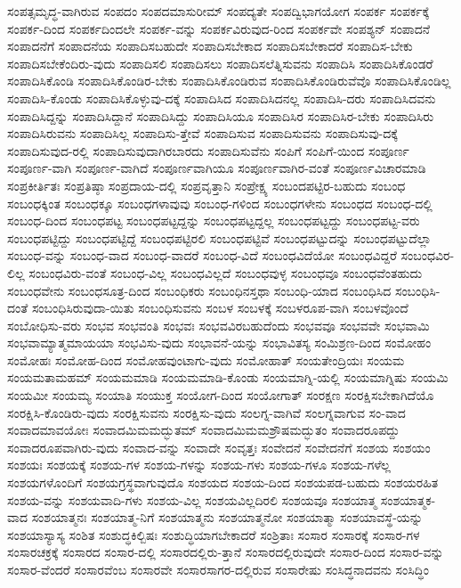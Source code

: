 {ಸಂಪತ್ಸಮೃದ್ಧ-ವಾಗಿರುವ
ಸಂಪದಂ
ಸಂಪದಮಾಸುರೀಮ್
ಸಂಪದ್ಯತೇ
ಸಂಪದ್ವಿಭಾಗಯೋಗ
ಸಂಪರ್ಕ
ಸಂಪರ್ಕಕ್ಕೆ
ಸಂಪರ್ಕ-ದಿಂದ
ಸಂಪರ್ಕದಿಂದಲೇ
ಸಂಪರ್ಕ-ವನ್ನು
ಸಂಪರ್ಕವಿರುವುದ-ರಿಂದ
ಸಂಪರ್ಕವೇ
ಸಂಪಶ್ಯನ್
ಸಂಪಾದನೆ
ಸಂಪಾದನೆಗೆ
ಸಂಪಾದನೆಯ
ಸಂಪಾದಿಸಬಹುದೇ
ಸಂಪಾದಿಸಬೇಕಾದ
ಸಂಪಾದಿಸಬೇಕಾದರೆ
ಸಂಪಾದಿಸ-ಬೇಕು
ಸಂಪಾದಿಸಬೇಕೆಂದಿರು-ವುದು
ಸಂಪಾದಿಸಲಿ
ಸಂಪಾದಿಸಲು
ಸಂಪಾದಿಸಲೆತ್ನಿಸುವನು
ಸಂಪಾದಿಸಿ
ಸಂಪಾದಿಸಿಕೊಂಡರೆ
ಸಂಪಾದಿಸಿಕೊಂಡಿ
ಸಂಪಾದಿಸಿಕೊಂಡಿರ-ಬೇಕು
ಸಂಪಾದಿಸಿಕೊಂಡಿರುವ
ಸಂಪಾದಿಸಿಕೊಂಡಿರುವೆವೊ
ಸಂಪಾದಿಸಿಕೊಂಡಿಲ್ಲ
ಸಂಪಾದಿಸಿ-ಕೊಂಡು
ಸಂಪಾದಿಸಿಕೊಳ್ಳುವು-ದಕ್ಕೆ
ಸಂಪಾದಿಸಿದ
ಸಂಪಾದಿಸಿದನಲ್ಲ
ಸಂಪಾದಿಸಿ-ದರು
ಸಂಪಾದಿಸಿದವನು
ಸಂಪಾದಿಸಿದ್ದನ್ನು
ಸಂಪಾದಿಸಿದ್ದಾನೆ
ಸಂಪಾದಿಸಿದ್ದು
ಸಂಪಾದಿಸಿಯೂ
ಸಂಪಾದಿಸಿರ
ಸಂಪಾದಿಸಿರ-ಬೇಕು
ಸಂಪಾದಿಸಿರು
ಸಂಪಾದಿಸಿರುವನು
ಸಂಪಾದಿಸಿಲ್ಲ
ಸಂಪಾದಿಸು-ತ್ತೇವೆ
ಸಂಪಾದಿಸುವ
ಸಂಪಾದಿಸುವನು
ಸಂಪಾದಿಸುವು-ದಕ್ಕೆ
ಸಂಪಾದಿಸುವುದ-ರಲ್ಲಿ
ಸಂಪಾದಿಸುವುದಾಗಿರಬಾರದು
ಸಂಪಾದಿಸುವೆನು
ಸಂಪಿಗೆ
ಸಂಪಿಗೆ-ಯಿಂದ
ಸಂಪೂರ್ಣ
ಸಂಪೂರ್ಣ-ವಾಗಿ
ಸಂಪೂರ್ಣ-ವಾಗಿದೆ
ಸಂಪೂರ್ಣವಾಗಿಯೂ
ಸಂಪೂರ್ಣವಾಗಿರ-ವಂತೆ
ಸಂಪೂರ್ಣವಿಚಾರಮಾಡಿ
ಸಂಪ್ರಕೀರ್ತಿತಃ
ಸಂಪ್ರತಿಷ್ಠಾ
ಸಂಪ್ರದಾಯ-ದಲ್ಲಿ
ಸಂಪ್ರವೃತ್ತಾನಿ
ಸಂಪ್ರೇಕ್ಷ್ಯ
ಸಂಬಂದಪಟ್ಟಿರ-ಬಹುದು
ಸಂಬಂಧ
ಸಂಬಂಧಕ್ಕಿಂತ
ಸಂಬಂಧಕ್ಕೂ
ಸಂಬಂಧಗಳಾವುವು
ಸಂಬಂಧ-ಗಳಿಂದ
ಸಂಬಂಧಗಳೇನು
ಸಂಬಂಧದ
ಸಂಬಂಧ-ದಲ್ಲಿ
ಸಂಬಂಧ-ದಿಂದ
ಸಂಬಂಧಪಟ್ಟ
ಸಂಬಂಧಪಟ್ಟದ್ದನ್ನು
ಸಂಬಂಧಪಟ್ಟದ್ದಲ್ಲ
ಸಂಬಂಧಪಟ್ಟದ್ದು
ಸಂಬಂಧಪಟ್ಟ-ವರು
ಸಂಬಂಧಪಟ್ಟಿದ್ದು
ಸಂಬಂಧಪಟ್ಟಿದ್ದೆ
ಸಂಬಂಧಪಟ್ಟಿರಲಿ
ಸಂಬಂಧಪಟ್ಟಿವೆ
ಸಂಬಂಧಪಟ್ಟುದನ್ನು
ಸಂಬಂಧಪಟ್ಟುದೆಲ್ಲಾ
ಸಂಬಂಧ-ವನ್ನು
ಸಂಬಂಧ-ವಾದ
ಸಂಬಂಧ-ವಾದರೆ
ಸಂಬಂಧ-ವಿದೆ
ಸಂಬಂಧವಿದೆಯೋ
ಸಂಬಂಧವಿದ್ದರೆ
ಸಂಬಂಧವಿರ-ಲಿಲ್ಲ
ಸಂಬಂಧವಿರು-ವಂತೆ
ಸಂಬಂಧ-ವಿಲ್ಲ
ಸಂಬಂಧವಿಲ್ಲದೆ
ಸಂಬಂಧವುಳ್ಳ
ಸಂಬಂಧವೂ
ಸಂಬಂಧವೆಂತಹುದು
ಸಂಬಂಧವೇನು
ಸಂಬಂಧಸೂತ್ರ-ದಿಂದ
ಸಂಬಂಧಿಕರು
ಸಂಬಂಧಿನಸ್ತಥಾ
ಸಂಬಂಧಿ-ಯಾದ
ಸಂಬಂಧಿಸಿದ
ಸಂಬಂಧಿಸಿ-ದಂತೆ
ಸಂಬಂಧಿಸಿರುವುದಾ-ಯಿತು
ಸಂಬಂಧಿಸುವನು
ಸಂಬಳ
ಸಂಬಳಕ್ಕೆ
ಸಂಬಳರೂಪ-ವಾಗಿ
ಸಂಬಳವೊಂದೆ
ಸಂಬೋಧಿಸು-ವರು
ಸಂಭವ
ಸಂಭವಂತಿ
ಸಂಭವಃ
ಸಂಭವವಿರಬಹುದೆಂದು
ಸಂಭವವೂ
ಸಂಭವವೇ
ಸಂಭವಾಮಿ
ಸಂಭವಾಮ್ಯಾತ್ಮಮಾಯಯಾ
ಸಂಭವಿಸು-ವುದು
ಸಂಭಾವನೆ-ಯನ್ನು
ಸಂಭಾವಿತಸ್ಯ
ಸಂಮಿಶ್ರಣ-ದಿಂದ
ಸಂಮೋಹಂ
ಸಂಮೋಹಃ
ಸಂಮೋಹ-ದಿಂದ
ಸಂಮೋಹವುಂಟಾಗು-ವುದು
ಸಂಮೋಹಾತ್
ಸಂಯತೇಂದ್ರಿಯಃ
ಸಂಯಮ
ಸಂಯಮತಾಮಹಮ್
ಸಂಯಮಮಾಡಿ
ಸಂಯಮಮಾಡಿ-ಕೊಂಡು
ಸಂಯಮಾಗ್ನಿ-ಯಲ್ಲಿ
ಸಂಯಮಾಗ್ನಿಷು
ಸಂಯಮಿ
ಸಂಯಮೀ
ಸಂಯಮ್ಯ
ಸಂಯಾತಿ
ಸಂಯುಕ್ತ
ಸಂಯೋಗ-ದಿಂದ
ಸಂಯೋಗಾತ್
ಸಂರಕ್ಷಣ
ಸಂರಕ್ಷಿಸಬೇಕಾಗಿದೆಯೊ
ಸಂರಕ್ಷಿಸಿ-ಕೊಂಡಿರು-ವುದು
ಸಂರಕ್ಷಿಸುವನು
ಸಂರಕ್ಷಿಸು-ವುದು
ಸಂಲಗ್ನ-ವಾಗಿವೆ
ಸಂಲಗ್ನವಾಗುವ
ಸಂ-ವಾದ
ಸಂವಾದಮಾವಯೋಃ
ಸಂವಾದಮಿಮಮದ್ಭುತಮ್
ಸಂವಾದಮಿಮಮಶ್ರೌಷಮದ್ಭುತಂ
ಸಂವಾದರೂಪದ್ದು
ಸಂವಾದರೂಪವಾಗಿರು-ವುದು
ಸಂವಾದ-ವನ್ನು
ಸಂವಾದೇ
ಸಂವೃತ್ತಃ
ಸಂವೇದನೆ
ಸಂವೇದನೆಗೆ
ಸಂಶಯ
ಸಂಶಯಂ
ಸಂಶಯಃ
ಸಂಶಯಕ್ಕೆ
ಸಂಶಯ-ಗಳ
ಸಂಶಯ-ಗಳನ್ನು
ಸಂಶಯ-ಗಳು
ಸಂಶಯ-ಗಳೂ
ಸಂಶಯ-ಗಳೆಲ್ಲ
ಸಂಶಯಗಳೊಂದಿಗೆ
ಸಂಶಯಗ್ರಸ್ಥವಾಗುವುದೊ
ಸಂಶಯದ
ಸಂಶಯ-ದಿಂದ
ಸಂಶಯಪಡ-ಬಹುದು
ಸಂಶಯರಹಿತ
ಸಂಶಯ-ವನ್ನು
ಸಂಶಯವಾದಿ-ಗಳು
ಸಂಶಯ-ವಿಲ್ಲ
ಸಂಶಯವಿಲ್ಲದಿರಲಿ
ಸಂಶಯವೂ
ಸಂಶಯಾತ್ಮ
ಸಂಶಯಾತ್ಮಕ-ವಾದ
ಸಂಶಯಾತ್ಮನಃ
ಸಂಶಯಾತ್ಮ-ನಿಗೆ
ಸಂಶಯಾತ್ಮನು
ಸಂಶಯಾತ್ಮನೋ
ಸಂಶಯಾತ್ಮಾ
ಸಂಶಯಾವಸ್ಥೆ-ಯನ್ನು
ಸಂಶಯಾಸ್ಯಾಸ್ಯ
ಸಂಶಿತ
ಸಂಶುದ್ಧಕಿಲ್ಬಿಷಃ
ಸಂಶುದ್ಧಿಯಾಗಬೇಕಾದರೆ
ಸಂಶ್ರಿತಾಃ
ಸಂಸಾರ
ಸಂಸಾರಕ್ಕೆ
ಸಂಸಾರ-ಗಳ
ಸಂಸಾರಚಕ್ರಕ್ಕೆ
ಸಂಸಾರದ
ಸಂಸಾರ-ದಲ್ಲಿ
ಸಂಸಾರದಲ್ಲಿರು-ತ್ತಾನೆ
ಸಂಸಾರದಲ್ಲಿರುವುದೇ
ಸಂಸಾರ-ದಿಂದ
ಸಂಸಾರ-ವನ್ನು
ಸಂಸಾರ-ವೆಂದರೆ
ಸಂಸಾರವೆಂಬ
ಸಂಸಾರವೇ
ಸಂಸಾರಸಾಗರ-ದಲ್ಲಿರುವ
ಸಂಸಾರೇಷು
ಸಂಸಿದ್ಧನಾದವನು
ಸಂಸಿದ್ಧಿಂ
}
